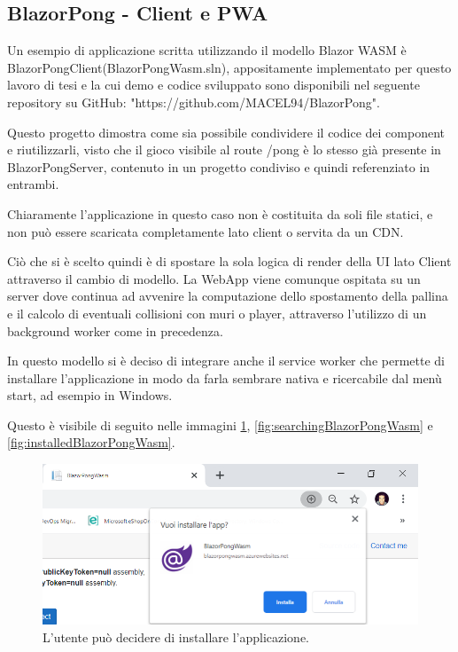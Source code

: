 \subsection{BlazorPong - Client e PWA}\label{sez:bpongclient}
Un esempio di applicazione scritta utilizzando il modello Blazor WASM \`e BlazorPongClient(BlazorPongWasm.sln), appositamente implementato per questo lavoro di tesi e la cui demo e codice sviluppato sono disponibili nel seguente repository su GitHub: "https://github.com/MACEL94/BlazorPong".

Questo progetto dimostra come sia possibile condividere il codice dei component e riutilizzarli, visto che il gioco visibile al route /pong \`e lo stesso gi\`a presente in BlazorPongServer, contenuto in un progetto condiviso e quindi referenziato in entrambi.

Chiaramente l'applicazione in questo caso non \`e costituita da soli file statici, e non pu\`o essere scaricata completamente lato client o servita da un CDN.

Ci\`o che si \`e scelto quindi \`e di spostare la sola logica di render della UI lato Client attraverso il cambio di modello.
La WebApp viene comunque ospitata su un server dove continua ad avvenire la computazione dello spostamento della pallina e il calcolo di eventuali collisioni con muri o player, attraverso l'utilizzo di un background worker come in precedenza.

In questo modello si \`e deciso di integrare anche il service worker che permette di installare l'applicazione in modo da farla sembrare nativa e ricercabile dal men\`u start, ad esempio in Windows.

Questo \`e visibile di seguito nelle immagini \ref{fig:installableBlazorPongWasm}, \ref{fig:searchingBlazorPongWasm} e \ref{fig:installedBlazorPongWasm}.
\begin{figure}[H]
	\centerline{\includegraphics[scale=0.6]{figure/installableBlazorPongWasm.png}}
	\caption{L'utente pu\`o decidere di installare l'applicazione.}
	\label{fig:installableBlazorPongWasm}
\end{figure}

